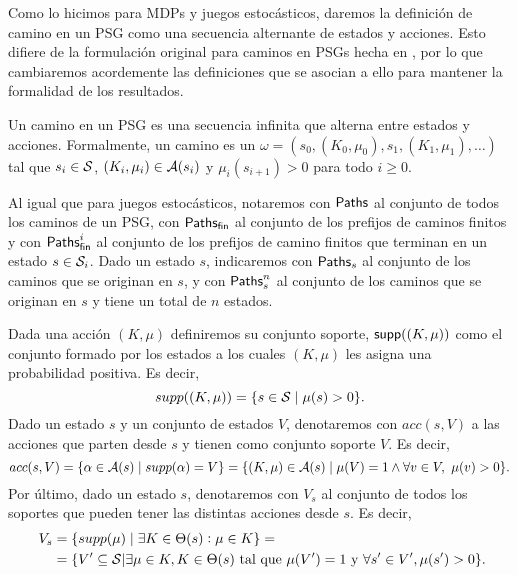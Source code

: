 Como lo hicimos para MDPs y juegos estocásticos, daremos la definición de
camino en un PSG como una secuencia alternante de estados y acciones. Esto
difiere de la formulación original para caminos en PSGs hecha en
\cite{Polytopal}, por lo que cambiaremos acordemente las definiciones que se
asocian a ello para mantener la formalidad de los resultados.

\begin{definition}
	Un camino en un PSG es una secuencia infinita que alterna entre estados y acciones. Formalmente, un camino es un $\omega = (s_0, (K_0, \mu_0), s_1, (K_1, \mu_1), \dots)$ tal que $s_i \in \mathcal{S}$, $(K_i, \mu_i) \in \mathcal{A}(s_i)$ y $\mu_i(s_{i+1}) > 0$ para todo $i \geq 0$.

	Al igual que para juegos estocásticos, notaremos con $\textsf{Paths}$ al conjunto de
	todos los caminos de un PSG, con $\textsf{Paths}_\textsf{fin}$ al conjunto de los prefijos de
	caminos finitos y con $\textsf{Paths}_\textsf{fin}^i$ al conjunto de los prefijos de camino
	finitos que terminan en un estado $s \in \mathcal{S}_i$. Dado un estado $s$,
	indicaremos con $\textsf{Paths}_s$ al conjunto de los caminos que se originan en $s$, y
	con $\textsf{Paths}_s^n$ al conjunto de los caminos que se originan en $s$ y tiene un
	total de $n$ estados.
\end{definition}

\begin{definition}
	Dada una acción $(K, \mu)$ definiremos su conjunto soporte, $\textsf{supp}((K, \mu))$ como el conjunto formado por los estados a los cuales $(K, \mu)$ les asigna una probabilidad positiva. Es decir,
	$$supp((K, \mu)) = \{s \in \mathcal{S} \mid \mu(s) > 0\}.$$
	Dado un estado $s$ y un conjunto de estados $V$, denotaremos con $acc(s, V)$ a
	las acciones que parten desde $s$ y tienen como conjunto soporte $V$. Es decir,
	$$acc(s, V) = \{\alpha \in \mathcal{A}(s) \mid supp(\alpha) = V\} = \{(K, \mu) \in \mathcal{A}(s) \mid \mu(V) = 1 \wedge \forall v \in V, \ \mu(v) > 0\}.$$
	Por último, dado un estado $s$, denotaremos con $V_s$ al conjunto de todos los
	soportes que pueden tener las distintas acciones desde $s$. Es decir,
	\begin{align*}~\label{definicionVs}
		V_s &= \{supp(\mu) \mid \exists K \in \Theta(s): \mu \in K\} = \\
		&= \{V' \subseteq \mathcal{S} | \exists \mu \in K, K \in \Theta(s) \text{ tal que } \mu(V') = 1 \text{ y } \forall s' \in V', \mu(s') > 0\}.
	\end{align*}
\end{definition}

